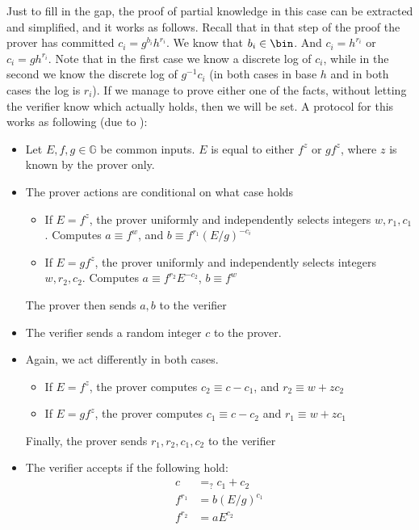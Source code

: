\documentclass{article}
\begin{document}
Just to fill in the gap, the proof of partial knowledge in this case can be extracted and simplified, and it works as follows.
Recall that in that step of the proof the prover has committed $c_i = g^{b_i} h^{r_i}$. We know that $b_i \in \bin$. And $c_i = h^{r_i}$ or $c_i = g h^{r_i}$.
Note that in the first case we know a discrete log of $c_i$, while in the second we know the discrete log of $g^{-1} c_i$ (in both cases in base $h$ and in both cases the log is $r_i$).
If we manage to prove either one of the facts, without letting the verifier know which actually holds, then we will be set.
A protocol for this works as following (due to \cite{maoGuaranteedCorrectSharing1998b}):
\begin{itemize}
    \item Let $E, f, g \in \mathbb{G}$ be common inputs. $E$ is equal to either $f^z$ or $g f^z$, where $z$ is known by the prover only.
    \item The prover actions are conditional on what case holds
          \begin{itemize}
              \item If $E = f^z$, the prover uniformly and independently selects integers $w, r_1, c_1$. Computes $a \equiv f^w$, and $b \equiv f^{r_1}(E/g)^{-c_i}$
              \item If $E = g f^z$, the prover uniformly and independently selects integers $w, r_2, c_2$. Computes $a \equiv f^{r_2} E^{-c_2}$, $b \equiv f^w$
          \end{itemize}
          The prover then sends $a, b$ to the verifier
    \item The verifier sends a random integer $c$ to the prover.
    \item Again, we act differently in both cases.
          \begin{itemize}
              \item If $E = f^z$, the prover computes $c_2 \equiv c - c_1$, and $r_2 \equiv w + z c_2$
              \item If $E = g f^z$, the prover computes $c_1 \equiv c - c_2$ and $r_1 \equiv w + z c_1$
          \end{itemize}
          Finally, the prover sends $r_1, r_2, c_1, c_2$ to the verifier
    \item The verifier accepts if the following hold:
          \begin{align*}
              c       & =_? c_1 + c_2  \\
              f^{r_1} & = b(E/g)^{c_1} \\
              f^{r_2} & = a E^{c_2}
          \end{align*}
\end{itemize}
\end{document}
